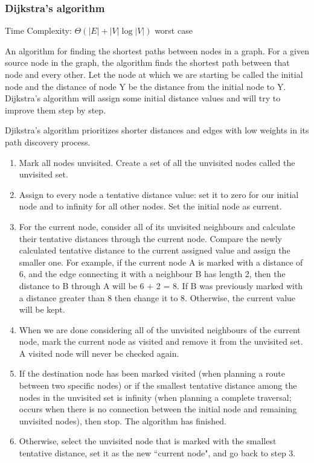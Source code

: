 \documentclass{article}
\begin{document}
    \subsubsection{Dijkstra's algorithm}
    Time Complexity: $\Theta (|E|+|V|\log |V|)$ worst case
    
    An algorithm for finding the shortest paths between nodes in a graph. For a given source node in the graph, the algorithm finds the shortest path between that node and every other. Let the node at which we are starting be called the initial node and the distance of node Y be the distance from the initial node to Y. Dijkstra's algorithm will assign some initial distance values and will try to improve them step by step.
    
    Djikstra's algorithm prioritizes shorter distances and edges with low weights in its path discovery process.
    
    \begin{enumerate}
        \item Mark all nodes unvisited. Create a set of all the unvisited nodes called the unvisited set.
        \item Assign to every node a tentative distance value: set it to zero for our initial node and to infinity for all other nodes. Set the initial node as current.
        \item For the current node, consider all of its unvisited neighbours and calculate their tentative distances through the current node. Compare the newly calculated tentative distance to the current assigned value and assign the smaller one. For example, if the current node A is marked with a distance of 6, and the edge connecting it with a neighbour B has length 2, then the distance to B through A will be 6 + 2 = 8. If B was previously marked with a distance greater than 8 then change it to 8. Otherwise, the current value will be kept.
        \item When we are done considering all of the unvisited neighbours of the current node, mark the current node as visited and remove it from the unvisited set. A visited node will never be checked again.
        
        \item If the destination node has been marked visited (when planning a route between two specific nodes) or if the smallest tentative distance among the nodes in the unvisited set is infinity (when planning a complete traversal; occurs when there is no connection between the initial node and remaining unvisited nodes), then stop. The algorithm has finished.
        
        \item Otherwise, select the unvisited node that is marked with the smallest tentative distance, set it as the new ``current node", and go back to step 3.
    \end{enumerate}
    
\end{document}
